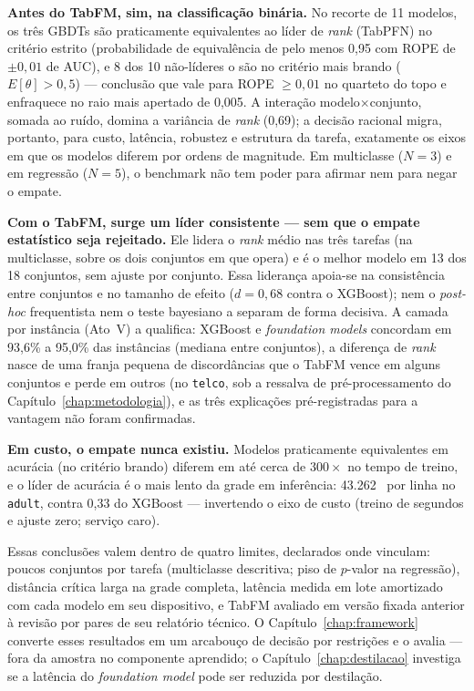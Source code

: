 \textbf{Antes do TabFM, sim, na classificação binária.} No recorte de
11 modelos, os três GBDTs são praticamente equivalentes ao líder de
\emph{rank} (TabPFN) no critério estrito (probabilidade de
equivalência de pelo menos 0,95 com ROPE de $\pm0{,}01$ de AUC), e 8
dos 10 não-líderes o são no critério mais brando ($E[\theta]>0{,}5$)
--- conclusão que vale para ROPE $\geq 0{,}01$ no quarteto do topo e
enfraquece no raio mais apertado de 0,005. A
interação modelo$\times$conjunto, somada ao ruído, domina a variância
de \emph{rank} (0,69); a decisão racional migra, portanto, para
custo, latência, robustez e estrutura da tarefa, exatamente os eixos
em que os modelos diferem por ordens de magnitude. Em multiclasse
($N{=}3$) e em regressão ($N{=}5$), o benchmark não tem poder para
afirmar nem para negar o empate.

\textbf{Com o TabFM, surge um líder consistente --- sem que o
empate estatístico seja rejeitado.} Ele lidera o \emph{rank} médio nas três
tarefas (na multiclasse, sobre os dois conjuntos em que opera) e é o
melhor modelo em 13 dos 18 conjuntos, sem ajuste por
conjunto. Essa liderança apoia-se na consistência entre conjuntos e no
tamanho de efeito ($d{=}0{,}68$ contra o XGBoost); nem o
\emph{post-hoc} frequentista nem o teste bayesiano a separam de forma
decisiva. A camada por instância (Ato~V) a qualifica: XGBoost e
\emph{foundation models} concordam em 93,6\% a 95,0\% das instâncias
(mediana entre conjuntos), a diferença de \emph{rank} nasce de uma
franja pequena de discordâncias que o TabFM vence em alguns conjuntos
e perde em outros (no \texttt{telco}, sob a ressalva de
pré-processamento do Capítulo~\ref{chap:metodologia}), e as três
explicações pré-registradas para a
vantagem não foram confirmadas.

\textbf{Em custo, o empate nunca existiu.} Modelos praticamente
equivalentes em acurácia (no critério brando) diferem em até cerca de
$300\times$ no tempo de treino, e o líder
de acurácia é o mais lento da grade em inferência: 43.262~\us{} por
linha no \texttt{adult}, contra 0,33 do XGBoost --- invertendo o eixo
de custo (treino de segundos e ajuste zero; serviço caro).

Essas conclusões valem dentro de quatro limites, declarados onde
vinculam: poucos conjuntos por tarefa (multiclasse descritiva; piso de
$p$-valor na regressão), distância crítica larga na grade completa,
latência medida em lote amortizado com cada modelo em seu dispositivo,
e TabFM avaliado em versão fixada anterior à revisão por pares de seu
relatório técnico. O Capítulo~\ref{chap:framework} converte esses
resultados em um arcabouço de decisão por restrições e o avalia ---
fora da amostra no componente aprendido; o
Capítulo~\ref{chap:destilacao}
investiga se a latência do \emph{foundation model} pode ser reduzida
por destilação.